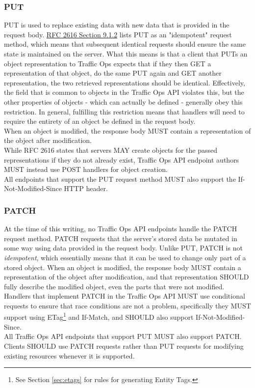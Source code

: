 \subsubsection{PUT}
PUT is used to replace existing data with new data that is provided in the request body.
\href{https://tools.ietf.org/html/rfc2616#section-9.1.2}{RFC 2616 Section 9.1.2} lists PUT as an "idempotent" request method, which means that
subsequent identical requests should ensure the same state is maintained on the server. What this means is that a client that PUTs an object
representation to Traffic Ops expects that if they then GET a representation of that object, do the same PUT again and GET another representation,
the two retrieved representations should be identical. Effectively, the  field that is common to objects in the Traffic Ops API
violates this, but the other properties of objects - which can actually be defined - generally obey this restriction. In general, fulfilling this
restriction means that handlers will need to require the entirety of an object be defined in the request body.\\
When an object is modified, the response body MUST contain a representation of
the object after modification.\\
While RFC 2616 states that servers MAY create objects for the passed representations if they do not already exist, Traffic Ops API endpoint authors
MUST instead use POST handlers for object creation.\\
All endpoints that support the PUT request method MUST also support the
If-Not-Modified-Since HTTP header.

\subsubsection{PATCH}
At the time of this writing, no Traffic Ops API endpoints handle the PATCH request method. PATCH requests that the server's stored data be mutated
in some way using data provided in the request body. Unlike PUT, PATCH is not \emph{idempotent}, which essentially means that it can be used to
change only part of a stored object. When an object is modified, the response body MUST contain a representation of the object after modification,
and that representation SHOULD fully describe the modified object, even the parts that were not modified.\\
Handlers that implement PATCH in the Traffic Ops API MUST use conditional
requests to ensure that race conditions are not a problem, specifically they
MUST support using ETag\footnote{See Section \ref{sec:etags} for rules for
generating Entity Tags.} and If-Match, and SHOULD also support
If-Not-Modified-Since.\\
All Traffic Ops API endpoints that support PUT MUST also support PATCH.
Clients SHOULD use PATCH requests rather than PUT requests for modifying existing resources whenever it is supported.

